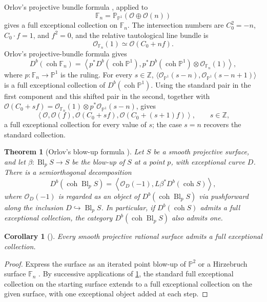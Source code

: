 \documentclass[11pt]{article}
\theoremstyle{plain}
\newtheorem{theorem}{Theorem}[section]
\newtheorem{corollary}[corollary]{Corollary}
\theoremstyle{definition}
\theoremstyle{remark}
\newcommand{\Pp}{\mathbb P}
\newcommand{\F}{\mathbb F}
\newcommand{\Z}{\mathbb Z}
\newcommand{\Db}{D^b}
\newcommand{\coh}{\operatorname{coh}}
\newcommand{\Bl}{\operatorname{Bl}}
\newcommand{\OO}{\mathcal O}
\begin{document}
Orlov's projective bundle formula \cite[Corollary 2.7]{Orlov1993}, applied to
\[
\F_n=\Pp_{\Pp^1}(\OO\oplus\OO(n))
\]
gives a full exceptional collection on \(\F_n\). The intersection numbers are \(C_0^2=-n\), \(C_0\cdot f=1\), and \(f^2=0\), and the relative tautological line bundle is
\[
\OO_{\F_n}(1)\simeq \OO(C_0+nf).
\]
Orlov's projective-bundle formula gives
\[
\Db(\coh\F_n)
=
\left\langle
p^*\Db(\coh\Pp^1),
p^*\Db(\coh\Pp^1)\otimes\OO_{\F_n}(1)
\right\rangle,
\]
where \(p:\F_n\to\Pp^1\) is the ruling. For every \(s\in\Z\),
\(\langle\OO_{\Pp^1}(s-n),\OO_{\Pp^1}(s-n+1)\rangle\) is a full
exceptional collection of \(\Db(\coh\Pp^1)\).
Using the standard pair in the first component and this shifted pair in
the second, together with
\(\OO(C_0+sf)=\OO_{\F_n}(1)\otimes p^*\OO_{\Pp^1}(s-n)\), gives
\begin{equation}\label{eq:hirzebruch-family}
\left\langle\OO,\OO(f),\OO(C_0+sf),\OO(C_0+(s+1)f)\right\rangle,
\qquad s\in\Z,
\end{equation}
a full exceptional collection for every value of \(s\); the case \(s=n\) recovers the standard collection.

\begin{theorem}[Orlov's blow-up formula {\cite[Theorem~4.3 and Corollary~4.4]{Orlov1993}}]\label{thm:orlov-blow-up}
Let \(S\) be a smooth projective surface, and let \(\beta:\Bl_pS\to S\) be the blow-up of \(S\) at a point \(p\), with exceptional curve \(D\). There is a semiorthogonal decomposition
\[
\Db(\coh \Bl_pS)
=
\left\langle
\OO_D(-1),L\beta^*\Db(\coh S)
\right\rangle,
\]
where \(\OO_D(-1)\) is regarded as an object of \(\Db(\coh \Bl_pS)\) via pushforward along the inclusion \(D\hookrightarrow \Bl_pS\). In particular, if \(\Db(\coh S)\) admits a full exceptional collection, the category \(\Db(\coh \Bl_pS)\) also admits one.
\end{theorem}

\begin{corollary}[{\cite[Theorem~5.6]{HillePerling2011}}]\label{cor:rational-surface-fec}
Every smooth projective rational surface admits a full exceptional collection.
\end{corollary}

\begin{proof}
Express the surface as an iterated point blow-up of \(\Pp^2\) or a
Hirzebruch surface \(\F_n\) \cite[Theorem~V.10]{Beauville1996}. By successive applications
of \cref{thm:orlov-blow-up}, the standard full exceptional collection on
the starting surface extends to a full exceptional collection on the
given surface, with one exceptional object added at each step.
\end{proof}
\end{document}
